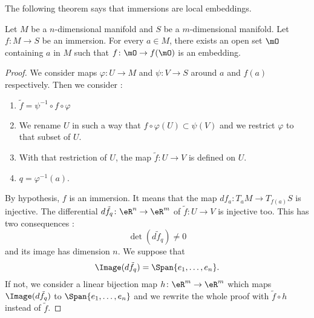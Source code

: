 The following theorem says that immersions are local embeddings.
\begin{theorem}       \label{THOooXAOUooRKHMBm}
	Let \( M\) be a \( n\)-dimensional manifold and \( S\) be a \( m\)-dimensional manifold. Let \( f\colon M\to S\) be an immersion. For every \( a\in M\), there exists an open set \( \mO\) containing \( a\) in \( M\) such that \( f\colon \mO\to f(\mO)\) is an embedding.
\end{theorem}

\begin{proof}
	We consider maps \( \varphi\colon U\to M\) and \( \psi\colon V\to S\) around \( a\) and \( f(a)\) respectively. Then we consider :
	\begin{enumerate}
		\item
		      \( \tilde f=\psi^{-1}\circ f\circ\varphi\)
		\item
		      We rename \( U  \) in such a way that \( f\circ\varphi(U)\subset \psi(V)\) and we restrict \( \varphi\) to that subset of \( U\).
		\item
		      With that restriction of \( U\), the map \( \tilde f\colon U\to V\) is defined on \( U\).
		\item
		      \( q=\varphi^{-1}(a)\).
	\end{enumerate}

	By hypothesis, \( f\) is an immersion. It means that the map \( df_a\colon T_aM\to T_{f(a)}S\) is injective. The differential \( d\tilde f_q\colon \eR^n\to \eR^m\) of \( \tilde f\colon U\to V\) is injective too. This has two consequences :
	\begin{equation}
		\det(d\tilde f_q)\neq 0
	\end{equation}
	and its image has dimension \( n\). We suppose that
	\begin{equation}
		\Image(d\tilde f_q)=\Span\{ e_1,\ldots, e_n \}.
	\end{equation}
	If not, we consider a linear bijection map \( h\colon \eR^m\to \eR^m\) which maps \( \Image(d\tilde f_q)\) to \( \Span\{ e_1,\ldots, e_n \}\) and we rewrite the whole proof with \( \tilde f\circ h\) instead of \( \tilde f\).


\end{proof}
